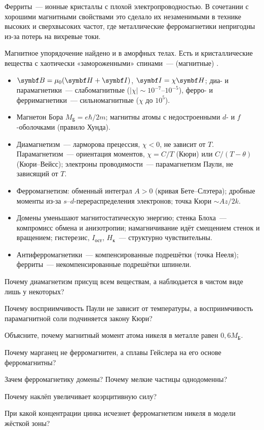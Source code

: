 Ферриты~— ионные кристаллы с плохой электропроводностью. В сочетании с
хорошими магнитными свойствами это сделало их незаменимыми в технике
высоких и сверхвысоких частот, где металлические ферромагнетики
непригодны из-за потерь на вихревые токи.

Магнитное упорядочение найдено и в аморфных телах. Есть и
кристаллические вещества с хаотически «замороженными» спинами~—
 (магнитные) .

\begin{itogi}
\begin{itemize}
\item $\vb B=\mu_0(\vb H+\vb I)$, $\vb I=\chi\vb H$; диа- и парамагнетики~—
слабомагнитные ($|\chi|\sim10^{-7}$--$10^{-5}$), ферро- и ферримагнетики~—
сильномагнитные ($\chi$ до $10^5$).
\item Магнетон Бора $M_\text{Б}=e\hbar/2m$; магнитны атомы с недостроенными
$d$- и $f$-оболочками (правило Хунда).
\item Диамагнетизм~— ларморова прецессия, $\chi<0$, не зависит от $T$.
Парамагнетизм~— ориентация моментов, $\chi=C/T$ (Кюри) или $C/(T-\theta)$
(Кюри--Вейсс); электроны проводимости~— парамагнетизм Паули, не
зависящий от $T$.
\item Ферромагнетизм: обменный интеграл $A>0$ (кривая Бете--Слэтера);
дробные моменты из-за $s$--$d$-перераспределения электронов; точка Кюри
$\sim A z/2k$.
\item Домены уменьшают магнитостатическую энергию; стенка Блоха~—
компромисс обмена и анизотропии; намагничивание идёт смещением стенок и
вращением; гистерезис, $I_\text{ост}$, $H_\text{к}$~— структурно
чувствительны.
\item Антиферромагнетики~— компенсированные подрешётки (точка Нееля);
ферриты~— некомпенсированные подрешётки шпинели.
\end{itemize}
\end{itogi}

\begin{proverka}
\item Почему диамагнетизм присущ всем веществам, а наблюдается в чистом
виде лишь у некоторых?
\item Почему восприимчивость Паули не зависит от температуры, а
восприимчивость парамагнитной соли подчиняется закону Кюри?
\item Объясните, почему магнитный момент атома никеля в металле равен
$0{,}6M_\text{Б}$.
\item Почему марганец не ферромагнитен, а сплавы Гейслера на его основе
ферромагнитны?
\item Зачем ферромагнетику домены? Почему мелкие частицы однодоменны?
\item Почему наклёп увеличивает коэрцитивную силу?
\item При какой концентрации цинка исчезнет ферромагнетизм никеля в модели
жёсткой зоны?
\end{proverka}
